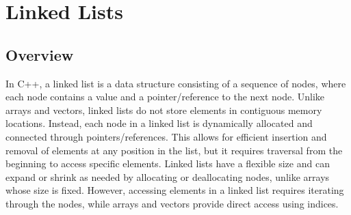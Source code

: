 \section*{Linked Lists}

\subsection*{Overview}

In C++, a linked list is a data structure consisting of a sequence of nodes, where each node contains a value and a pointer/reference to the next node. Unlike arrays and vectors, linked lists do not 
store elements in contiguous memory locations. Instead, each node in a linked list is dynamically allocated and connected through pointers/references. This allows for efficient insertion and removal 
of elements at any position in the list, but it requires traversal from the beginning to access specific elements. Linked lists have a flexible size and can expand or shrink as needed by allocating 
or deallocating nodes, unlike arrays whose size is fixed. However, accessing elements in a linked list requires iterating through the nodes, while arrays and vectors provide direct access using indices.